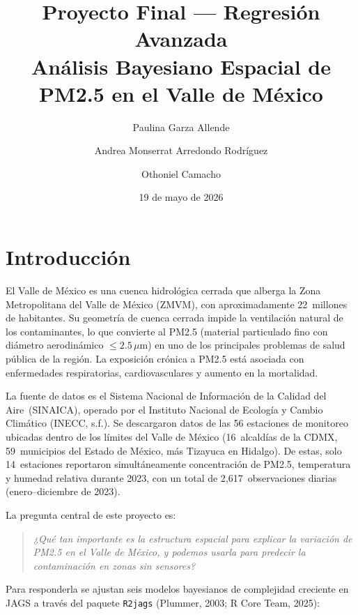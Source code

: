 \documentclass[12pt]{article}
\title{Proyecto Final --- Regresi\'on Avanzada\\[6pt]
       \large An\'alisis Bayesiano Espacial de PM2.5 en el Valle de M\'exico}
\author{Paulina Garza Allende \and Andrea Monserrat Arredondo Rodr\'iguez \and Othoniel Camacho}
\date{19 de mayo de 2026}
\begin{document}
\maketitle

\tableofcontents
\bigskip

\section{Introducci\'on}

El Valle de M\'exico es una cuenca hidrol\'ogica cerrada que alberga la
Zona Metropolitana del Valle de M\'exico (ZMVM), con aproximadamente
22~millones de habitantes.
Su geometr\'ia de cuenca cerrada impide la ventilaci\'on natural de los
contaminantes, lo que convierte al PM2.5 (material particulado fino con
di\'ametro aerodin\'amico $\leq 2.5\,\mu$m) en uno de los principales
problemas de salud p\'ublica de la regi\'on.
La exposici\'on cr\'onica a PM2.5 est\'a asociada con enfermedades
respiratorias, cardiovasculares y aumento en la mortalidad.

La fuente de datos es el Sistema Nacional de Informaci\'on de la
Calidad del Aire~(SINAICA), operado por el Instituto Nacional de
Ecolog\'ia y Cambio Clim\'atico (INECC, s.f.).
Se descargaron datos de las 56 estaciones de monitoreo ubicadas dentro
de los l\'imites del Valle de M\'exico (16~alcald\'ias de la CDMX,
59~municipios del Estado de M\'exico, m\'as Tizayuca en Hidalgo).
De estas, solo 14~estaciones reportaron simult\'aneamente concentraci\'on
de PM2.5, temperatura y humedad relativa durante 2023,
con un total de 2{,}617~observaciones diarias (enero--diciembre de 2023).

La pregunta central de este proyecto es:
\begin{quote}
\emph{¿Qu\'e tan importante es la estructura espacial para explicar la variaci\'on
de PM2.5 en el Valle de M\'exico, y podemos usarla para predecir la
contaminaci\'on en zonas sin sensores?}
\end{quote}

Para responderla se ajustan seis modelos bayesianos de complejidad
creciente en JAGS a trav\'es del paquete \texttt{R2jags} (Plummer, 2003; R Core Team, 2025):
\end{document}
